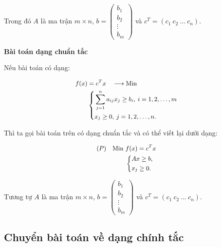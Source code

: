 \documentclass[12pt,a4paper]{report}
\begin{document}
    Trong đó $A$ là ma trận $m\times n$, $b=\begin{pmatrix}
        b_1 \\
        b_2 \\
        \vdots \\
        b_m
        \end{pmatrix}$ và $c^T=(c_1 \: c_2 \: \ldots \: c_n)$.

     \textbf{Bài toán dạng chuẩn tắc}
    
    Nếu bài toán có dạng:

    \begin{equation} \small \label{F}
        \begin{split}
        f(x) & = c^Tx \quad \longrightarrow \text{Min} \\
            & \left\{
            \begin{split}
            & \sum _{j=1}^n a_{ij} x_j \geq b_i, \: i=1,2,\ldots,m \\
            & x_j \geq 0, \: j=1,2,\ldots,n.
            \end{split}
            \right.    
        \end{split}
    \end{equation}

    Thì ta gọi bài toán trên có dạng chuẩn tắc và có thể viết lại dưới dạng:

    \begin{equation} \small \label{F}
        \begin{split}
        (P) \quad \text{Min } & f(x) = c^Tx \\
            & \left\{
            \begin{split}
            & Ax \geq b, \\
            & x_j \geq 0.
            \end{split}
            \right.    
        \end{split}
    \end{equation}

    Tương tự $A$ là ma trận $m\times n$, $b=\begin{pmatrix}
        b_1 \\
        b_2 \\
        \vdots \\
        b_m
        \end{pmatrix}$ và $c^T=(c_1 \: c_2 \: \ldots \: c_n)$.



\subsection{Chuyển bài toán về dạng chính tắc}
\end{document}
